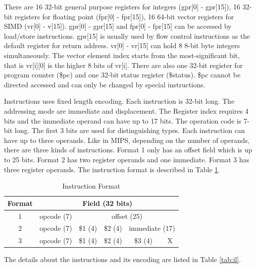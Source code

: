 \documentclass{sig-alternate}
\begin{document}
There are 16 32-bit general purpose registers for integers (gpr[0] - gpr[15]), 16 32-bit registers for floating point (fpr[0] - fpr[15]), 16 64-bit vector registers for SIMD (vr[0] - v[15]). gpr[0] - gpr[15] and fpr[0] - fpr[15] can be accessed by load/store instructions. gpr[15] is usually used by flow control instructions as the default register for return address. vr[0] - vr[15] can hold 8 8-bit byte integers simultaneously. The vector element index starts from the most-significant bit, that is vr[i][0] is the higher 8 bits of vr[i]. There are also one 32-bit register for program counter (\$pc) and one 32-bit status register (\$status). \$pc cannot be directed accessed and can only be changed by special instructions.

Instructions uses fixed length encoding. Each instruction is 32-bit long. The addressing mode are immediate and displacement. The Register index requires 4 bits and the immediate operand can have up to 17 bits. The operation code is 7-bit long. The first 3 bits are used for distinguishing types. Each instruction can have up to three operands. Like in MIPS, depending on the number of operands, there are three kinds of instructions. Format 1 only has an offset field which is up to 25 bits. Format 2 has two register operands and one immediate. Format 3 has three register operands. The instruction format is described in Table \ref{tab:if}. 

\begin{table}
\caption{Instruction Format}
\label{tab:if}
\begin{tabular}{|c|c|c|c|c|c|}
\hline
 Format & \multicolumn{5}{c|}{Field (32 bits)}\\
 \hline
1 & opcode (7) & \multicolumn{4}{c|}{offset (25)}\\
\hline
2 & opcode (7) & \$1 (4) & \$2 (4) & \multicolumn{2}{c|}{immediate (17)}\\
\hline
3 & opcode (7) & \$1 (4) & \$2 (4) & \$3 (4) & X\\
\hline
\end{tabular}
\end{table}

The details about the instructions and its encoding are listed in Table \ref{tab:il}.
\end{document}
